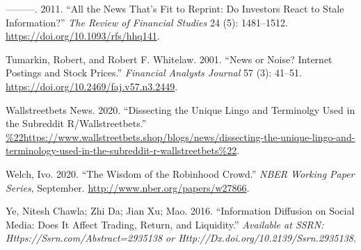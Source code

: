\documentclass[12pt,]{article}
\begin{document}
\leavevmode\hypertarget{ref-tetlock2011}{}%
---------. 2011. ``All the News That's Fit to Reprint: Do Investors
React to Stale Information?'' \emph{The Review of Financial Studies} 24
(5): 1481--1512. \url{https://doi.org/10.1093/rfs/hhq141}.

\leavevmode\hypertarget{ref-tumarkin2001}{}%
Tumarkin, Robert, and Robert F. Whitelaw. 2001. ``News or Noise?
Internet Postings and Stock Prices.'' \emph{Financial Analysts Journal}
57 (3): 41--51. \url{https://doi.org/10.2469/faj.v57.n3.2449}.

\leavevmode\hypertarget{ref-wsbshop}{}%
Wallstreetbets News. 2020. ``Dissecting the Unique Lingo and Terminolgy
Used in the Subreddit R/Wallstreetbets.''
\url{\%22https://www.wallstreetbets.shop/blogs/news/dissecting-the-unique-lingo-and-terminology-used-in-the-subreddit-r-wallstreetbets\%22}.

\leavevmode\hypertarget{ref-welch2020}{}%
Welch, Ivo. 2020. ``The Wisdom of the Robinhood Crowd.'' \emph{NBER
Working Paper Series}, September.
\url{http://www.nber.org/papers/w27866}.

\leavevmode\hypertarget{ref-chawla2016}{}%
Ye, Nitesh Chawla; Zhi Da; Jian Xu; Mao. 2016. ``Information Diffusion
on Social Media: Does It Affect Trading, Return, and Liquidity.''
\emph{Available at SSRN: Https://Ssrn.com/Abstract=2935138 or
Http://Dx.doi.org/10.2139/Ssrn.2935138}.





\newpage
\singlespacing 
\end{document}
